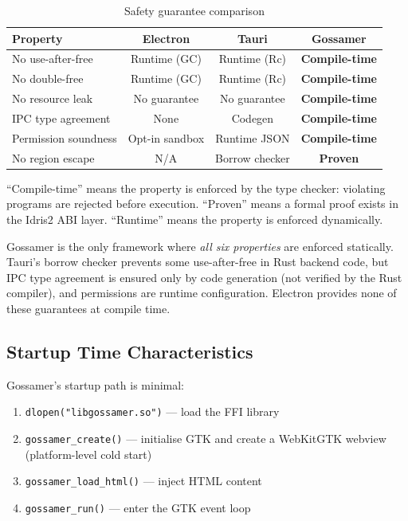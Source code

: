 \documentclass[11pt,a4paper]{article}
\theoremstyle{definition}
\begin{document}
\begin{table}[ht]
\centering
\caption{Safety guarantee comparison}
\label{tab:guarantees}
\small
\begin{tabular}{@{}lccc@{}}
\toprule
\textbf{Property} & \textbf{Electron} & \textbf{Tauri} & \textbf{Gossamer} \\
\midrule
No use-after-free     & Runtime (GC)   & Runtime (Rc)   & \textbf{Compile-time} \\
No double-free        & Runtime (GC)   & Runtime (Rc)   & \textbf{Compile-time} \\
No resource leak      & No guarantee   & No guarantee   & \textbf{Compile-time} \\
IPC type agreement    & None           & Codegen        & \textbf{Compile-time} \\
Permission soundness  & Opt-in sandbox & Runtime JSON   & \textbf{Compile-time} \\
No region escape      & N/A            & Borrow checker & \textbf{Proven} \\
\bottomrule
\end{tabular}
\par\smallskip
{\footnotesize ``Compile-time'' means the property is enforced by the
type checker: violating programs are rejected before execution.
``Proven'' means a formal proof exists in the Idris2 ABI layer.
``Runtime'' means the property is enforced dynamically.}
\end{table}

Gossamer is the only framework where \emph{all six properties} are
enforced statically. Tauri's borrow checker prevents some use-after-free
in Rust backend code, but IPC type agreement is ensured only by code
generation (not verified by the Rust compiler), and permissions are
runtime configuration. Electron provides none of these guarantees at
compile time.

\subsection{Startup Time Characteristics}

Gossamer's startup path is minimal:
\begin{enumerate}[nosep]
  \item \texttt{dlopen("libgossamer.so")} --- load the FFI library
  \item \texttt{gossamer\_create()} --- initialise GTK and create a
    WebKitGTK webview (platform-level cold start)
  \item \texttt{gossamer\_load\_html()} --- inject HTML content
  \item \texttt{gossamer\_run()} --- enter the GTK event loop
\end{enumerate}
\end{document}

